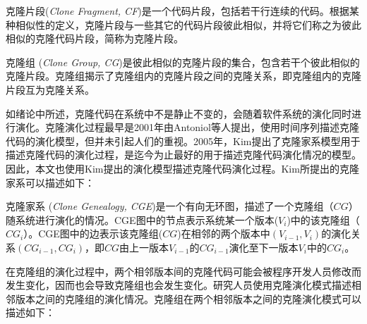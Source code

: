 \begin{definition}[克隆片段]
\label{defn-clonefragment}
克隆片段({\em Clone Fragment, CF\/})是一个代码片段，包括若干行连续的代码。根据某种相似性的定义，克隆片段与一些其它的代码片段彼此相似，并将它们称之为彼此相似的克隆代码片段，简称为克隆片段。
\end{definition}

\begin{definition}[{克隆组}]
\label {def-clonegroup}
克隆组 ({\em Clone Group, CG})是彼此相似的克隆片段的集合，包含若干个彼此相似的克隆片段。克隆组揭示了克隆组内的克隆片段之间的克隆关系，即克隆组内的克隆片段互为克隆关系。
\end {definition}


如绪论中所述，克隆代码在系统中不是静止不变的，会随着软件系统的演化同时进行演化。克隆演化过程最早是2001年由Antoniol等人提出，使用时间序列描述克隆代码的演化模型\cite{antoniol2001modeling}，但并未引起人们的重视。2005年，Kim提出了克隆家系模型用于描述克隆代码的演化过程，是迄今为止最好的用于描述克隆代码演化情况的模型\cite{kim2005empirical}。因此，本文也使用Kim提出的演化模型描述克隆代码演化过程。Kim所提出的克隆家系可以描述如下：\\

\begin{definition}[{克隆家系}]
\label{def-clonegenealogy}
克隆家系 ({\em Clone Genealogy, CGE\/})是一个有向无环图，描述了一个克隆组（$CG$）随系统进行演化的情况。CGE图中的节点表示系统某一个版本($V_i$)中的该克隆组（$CG_i$）。CGE图中的边表示该克隆组($CG$)在相邻的两个版本中$(V_{i-1},V_i )$的演化关系$(CG_{i-1},CG_{i})$，即$CG$由上一版本$V_{i-1}$的$CG_{i-1}$演化至下一版本$V_{i}$中的$CG_{i}$。
\end{definition} 

在克隆组的演化过程中，两个相邻版本间的克隆代码可能会被程序开发人员修改而发生变化，因而也会导致克隆组也会发生变化。研究人员使用克隆演化模式描述相邻版本之间的克隆组的演化情况。克隆组在两个相邻版本之间的克隆演化模式可以描述如下：\\

